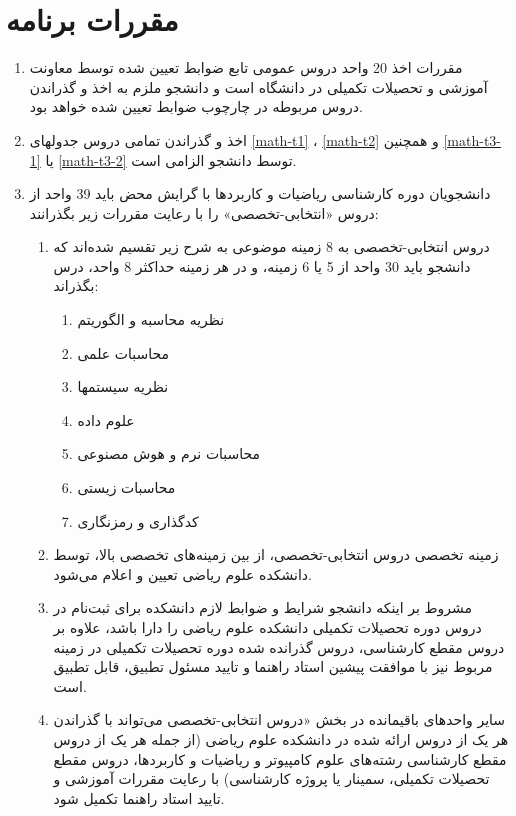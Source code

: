 \documentclass{article}
\begin{document}
    \section{مقررات برنامه}
    \begin{enumerate}
        \item
        مقررات اخذ 20 واحد دروس عمومی تابع ضوابط تعیین شده توسط معاونت آموزشی و تحصیلات تکمیلی در دانشگاه است و دانشجو ملزم به اخذ و گذراندن دروس مربوطه در چارچوب ضوابط تعیین شده خواهد بود.
        \item
        اخذ و گذراندن تمامی دروس جدولهای
        \ref{math-t1}
        ،
		\ref{math-t2}
		و همچنین
		\ref{math-t3-1}
		یا
		\ref{math-t3-2}
         توسط دانشجو الزامی است.
        \item
		دانشجویان دوره کارشناسی ریاضیات و کاربردها با گرایش محض باید 39 واحد از دروس «انتخابی-تخصصی» را با رعایت مقررات زیر بگذرانند:
        \begin{enumerate}
            \item
          دروس انتخابی-تخصصی به 8 زمینه موضوعی به شرح زیر تقسیم شده‌اند که دانشجو باید 30 واحد از 5 یا 6 زمینه، و در هر زمینه حداکثر 8 واحد، درس بگذراند:
            \begin{enumerate}
                \item
                نظریه محاسبه و الگوریتم
                \item
                 محاسبات علمی
                \item
                 نظریه سیستمها
                \item
                 علوم داده
                \item
                 محاسبات نرم و هوش مصنوعی
                \item
                 محاسبات زیستی
                \item
                 کدگذاری و رمزنگاری
            \end{enumerate}
            \item
		زمینه‌ تخصصی دروس انتخابی-تخصصی، از بین زمینه‌های تخصصی بالا، توسط دانشکده علوم ریاضی تعیین و اعلام می‌شود.
            \item
             مشروط بر اینکه دانشجو شرایط و ضوابط لازم دانشکده برای ثبت‌نام در دروس دوره تحصیلات تکمیلی دانشکده علوم ریاضی را دارا باشد، علاوه بر دروس مقطع کارشناسی، دروس گذرانده شده دوره تحصیلات تکمیلی در زمینه مربوط نیز با موافقت پیشین استاد راهنما و تایید مسئول تطبیق، قابل تطبیق است.
             \item
             سایر واحدهای باقیمانده در بخش «دروس انتخابی-تخصصی می‌تواند با گذراندن هر یک از دروس ارائه شده در دانشکده علوم ریاضی (از جمله هر یک از دروس مقطع کارشناسی رشته‌های علوم کامپیوتر و ریاضیات و کاربردها، دروس مقطع تحصیلات تکمیلی، سمینار یا پروژه کار‌شناسی) با رعایت مقررات آموزشی و تایید استاد راهنما تکمیل شود.

\end{enumerate}
\end{enumerate}
\end{document}
